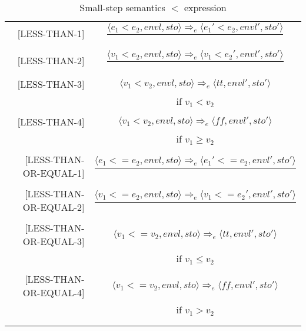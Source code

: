 \begin{longtable}[c] { r c }
  [LESS-THAN-1] & \( 
    \dfrac { \langle e_1 < e_2, envl, sto \rangle \Rightarrow_e \langle e_1' < e_2, envl', sto' \rangle }
      { } \)
  \\
  & \\

  [LESS-THAN-2] & \( 
    \dfrac { \langle v_1 < e_2, envl, sto \rangle \Rightarrow_e \langle v_1 < e_2', envl', sto' \rangle }
      { } \)
  \\
  & \\

  [LESS-THAN-3] & \( 
    \langle v_1 < v_2, envl, sto \rangle \Rightarrow_e \langle tt, envl', sto' \rangle \)
  \\
  & if \( v_1 < v_2 \) \\
  & \\

  [LESS-THAN-4] & \( 
    \langle v_1 < v_2, envl, sto \rangle \Rightarrow_e \langle ff, envl', sto' \rangle \)
  \\
  & if \( v_1 \geq v_2 \) \\
  & \\

  [LESS-THAN-OR-EQUAL-1] & \( 
    \dfrac { \langle e_1 < = e_2, envl, sto \rangle \Rightarrow_e \langle e_1' < = e_2, envl', sto' \rangle }
      { } \)
  \\
  & \\

  [LESS-THAN-OR-EQUAL-2] & \( 
    \dfrac { \langle v_1 < = e_2, envl, sto \rangle \Rightarrow_e \langle v_1 < = e_2', envl', sto' \rangle }
      { } \)
  \\
  & \\

  [LESS-THAN-OR-EQUAL-3] & \( 
    \langle v_1 < = v_2, envl, sto \rangle \Rightarrow_e \langle tt, envl', sto' \rangle \)
  \\
  & if \( v_1 \leq v_2 \) \\
  & \\

  [LESS-THAN-OR-EQUAL-4] & \( 
    \langle v_1 < = v_2, envl, sto \rangle \Rightarrow_e \langle ff, envl', sto' \rangle \)
  \\
  & if \( v_1 > v_2 \) \\
  & \\
  \caption{Small-step semantics $<$ expression}
\end{longtable}